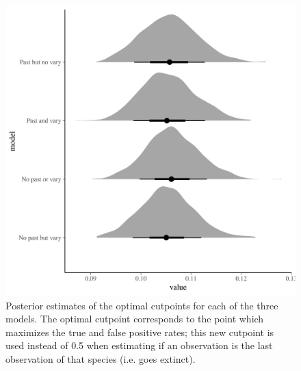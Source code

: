 \documentclass[12pt,letterpaper]{article}
\begin{document}
\begin{figure}[ht]
  \centering
  \includegraphics[width=\textwidth,height=0.5\textheight,keepaspectratio=true]{figure/cut_plot}
  \caption{Posterior estimates of the optimal cutpoints for each of the three models. The optimal cutpoint corresponds to the point which maximizes the true and false positive rates; this new cutpoint is used instead of 0.5 when estimating if an observation is the last observation of that species (i.e. goes extinct).}
  \label{fig:cut_point}
\end{figure}
\end{document}
